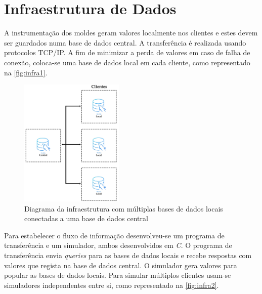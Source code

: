 \documentclass[11pt,twoside,a4paper]{report}
\begin{document}
\section{Infraestrutura de Dados}
A instrumentação dos moldes geram valores localmente nos clientes e estes devem ser guardados numa base de dados central. A transferência é realizada usando protocolos TCP/IP. A fim de minimizar a perda de valores em caso de falha de conexão, coloca-se uma base de dados local em cada cliente, como representado na \autoref{fig:infra1}.
\begin{figure}[H]
	\begin{center}
		\includegraphics[width=0.44\textwidth]{Esquema_Projeto_4} %
		\caption[Diagrama das bases de dados]{Diagrama da infraestrutura com múltiplas bases de dados locais conectadas a uma base de dados central}
		\label{fig:infra1}
		\end{center}
\end{figure}
Para estabelecer o fluxo de informação desenvolveu-se um programa de transferência e um simulador, ambos desenvolvidos em \textit{C}. O programa de transferência envia \textit{queries} para as bases de dados locais e recebe respostas com valores que regista na base de dados central. O simulador gera valores para popular as bases de dados locais. Para simular múltiplos clientes usam-se simuladores independentes entre si, como representado na \autoref{fig:infra2}.
\end{document}
